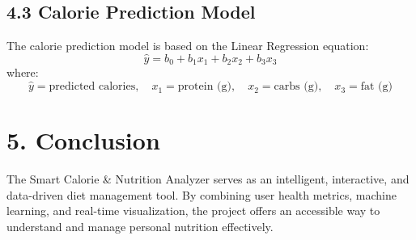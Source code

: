 \documentclass[12pt,a4paper]{article}
\begin{document}
\subsection*{4.3 Calorie Prediction Model}
The calorie prediction model is based on the Linear Regression equation:
\[
\hat{y} = b_0 + b_1x_1 + b_2x_2 + b_3x_3
\]
where:
\[
\hat{y} = \text{predicted calories}, \quad x_1 = \text{protein (g)}, \quad x_2 = \text{carbs (g)}, \quad x_3 = \text{fat (g)}
\]

\section*{5. Conclusion}
The Smart Calorie \& Nutrition Analyzer serves as an intelligent, interactive, and data-driven diet management tool. 
By combining user health metrics, machine learning, and real-time visualization, the project offers an accessible way to understand and manage personal nutrition effectively.
\end{document}
